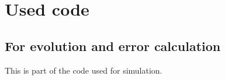 
\chapter{Used code} %

\label{AppendixA} %

\section{For evolution and error calculation}

This is part of the code used for simulation.

\inputminted[linenos, breaklines]{python}{Appendices/ADM_cart_2.py}

%
%
%
%
%
%
%
%
